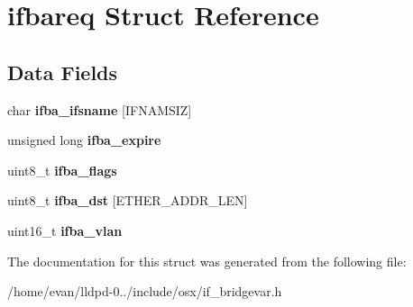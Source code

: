 \section{ifbareq \-Struct \-Reference}
\label{structifbareq}
\subsection*{\-Data \-Fields}
\begin{DoxyCompactItemize}
\item 
char {\bfseries ifba\-\_\-ifsname} [\-I\-F\-N\-A\-M\-S\-I\-Z]\label{structifbareq_acc843dd797efcccec6dc6b5502006047}

\item 
unsigned long {\bfseries ifba\-\_\-expire}\label{structifbareq_ae0935c84c7536f474470dc79066a488e}

\item 
uint8\-\_\-t {\bfseries ifba\-\_\-flags}\label{structifbareq_a338a0bb88b200231cb85d2da7a45aad9}

\item 
uint8\-\_\-t {\bfseries ifba\-\_\-dst} [\-E\-T\-H\-E\-R\-\_\-\-A\-D\-D\-R\-\_\-\-L\-E\-N]\label{structifbareq_a2629e9bcb428abf4f72c420ee9a70eba}

\item 
uint16\-\_\-t {\bfseries ifba\-\_\-vlan}\label{structifbareq_a80558d877eb6180758a93e2fdfcc04d7}

\end{DoxyCompactItemize}


\-The documentation for this struct was generated from the following file\-:\begin{DoxyCompactItemize}
\item 
/home/evan/lldpd-\/0../include/osx/if\-\_\-bridgevar.\-h\end{DoxyCompactItemize}
